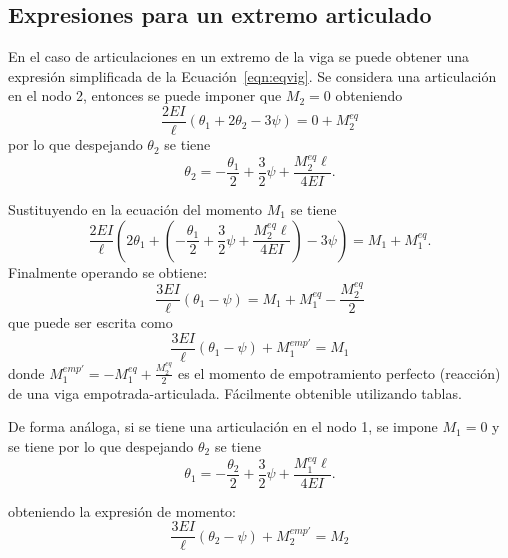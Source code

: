 \subsection{Expresiones para un extremo articulado}

En el caso de articulaciones en un extremo de la viga se puede obtener una expresión simplificada de la Ecuación~\eqref{eqn:eqvig}. %
%
Se considera una articulación en el nodo 2, entonces se puede imponer que $M_2=0$ obteniendo  
%
\begin{equation}
\frac{2 EI}{\ell} \left( \theta_1 + 2  \theta_2 - 3 \psi  \right) = 0 + M_2^{eq}
\end{equation}
%
por lo que despejando $\theta_{2}$ se tiene
%
\begin{equation} \label{eqn:artictheta2}
\theta_2 = -\frac{\theta_1}{2} + \frac{3}{2} \psi + \frac{M_2^{eq} \ell }{4 EI}.
\end{equation}

Sustituyendo en la ecuación del momento $M_1$ se tiene
%
\begin{equation}
\frac{2 EI}{\ell} \left( 2 \theta_1 + \left( -\frac{\theta_1}{2} + \frac{3}{2} \psi + \frac{M_2^{eq} \ell }{4 EI} \right) - 3 \psi  \right) = M_1 + M_1^{eq}.
\end{equation}
%
Finalmente operando se obtiene:
%
\begin{equation} \label{eqn:ecmomart}
\frac{3 EI}{\ell} \left( \theta_1 - \psi  \right) = M_1 + M_1^{eq} - \frac{ M_2^{eq}}{2}
\end{equation}
%
que puede ser escrita como
%
\begin{equation}
\boxed{
\frac{3 EI}{\ell} \left( \theta_1 - \psi  \right) + M_1^{emp'} = M_1
}
\end{equation}
%
donde $M_1^{emp'} = - M_1^{eq} + \frac{ M_2^{eq}}{2} $ es el momento de empotramiento perfecto (reacción) de una viga empotrada-articulada. %
%
Fácilmente obtenible utilizando tablas.


De forma análoga, si se tiene una articulación en el nodo 1, se impone $M_1=0$ y se tiene
por lo que despejando $\theta_{2}$ se tiene
%
\begin{equation} \label{eqn:artictheta1}
\theta_1 = -\frac{\theta_2}{2} + \frac{3}{2} \psi + \frac{M_1^{eq} \ell }{4 EI}.
\end{equation}

obteniendo la expresión de momento:%
\begin{equation}
\boxed{
	\frac{3 EI}{\ell} \left( \theta_2 - \psi  \right) + M_2^{emp'} = M_2
}
\end{equation}


